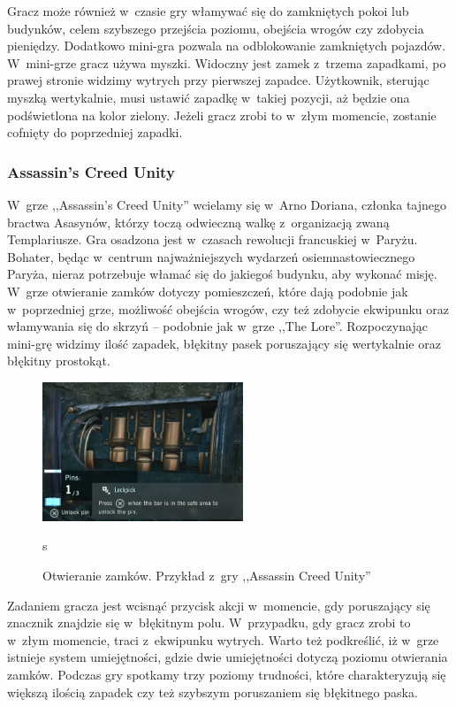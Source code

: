 \documentclass[oneside,polski,logo]{amuthesis}
\begin{document}
Gracz może również w~czasie gry włamywać się do zamkniętych pokoi lub budynków, celem szybszego przejścia poziomu, obejścia wrogów czy zdobycia pieniędzy. Dodatkowo mini-gra pozwala na odblokowanie zamkniętych pojazdów. W~mini-grze gracz używa myszki. Widoczny jest zamek z~trzema zapadkami, po prawej stronie widzimy wytrych przy pierwszej zapadce. Użytkownik, sterując myszką wertykalnie, musi ustawić zapadkę w~takiej pozycji, aż będzie ona podświetlona na kolor zielony. Jeżeli gracz zrobi to w~złym momencie, zostanie cofnięty do poprzedniej zapadki. \cite{Mafia2}

\subsubsection{Assassin's Creed Unity}
\par W~grze ,,Assassin's Creed Unity'' wcielamy się w~Arno Doriana, członka tajnego bractwa Asasynów, którzy toczą odwieczną walkę z~organizacją zwaną Templariusze. Gra osadzona jest w~czasach rewolucji francuskiej w~Paryżu. Bohater, będąc w~centrum najważniejszych wydarzeń osiemnastowiecznego Paryża, nieraz potrzebuje włamać się do jakiegoś budynku, aby wykonać misję. W~grze otwieranie zamków dotyczy pomieszczeń, które dają podobnie jak w~poprzedniej grze, możliwość obejścia wrogów, czy też zdobycie ekwipunku oraz włamywania się do skrzyń – podobnie jak w~grze ,,The Lore''. Rozpoczynając mini-grę widzimy ilość zapadek, błękitny pasek poruszający się wertykalnie oraz błękitny prostokąt. 
\begin{figure}[h]
	\centering
	\includegraphics[width=6cm]{images/tyrek/acu.png}
	\caption{Otwieranie zamków. Przykład z~gry ,,Assassin Creed Unity''}s
	\end{figure}
Zadaniem gracza jest wcisnąć przycisk akcji w~momencie, gdy poruszający się znacznik znajdzie się w~błękitnym polu. W~przypadku, gdy gracz zrobi to w~złym momencie, traci z~ekwipunku wytrych. Warto też podkreślić, iż w~grze istnieje system umiejętności, gdzie dwie umiejętności dotyczą poziomu otwierania zamków. Podczas gry spotkamy trzy poziomy trudności, które charakteryzują się większą ilością zapadek czy też szybszym poruszaniem się błękitnego paska. \cite{acu}
\end{document}
